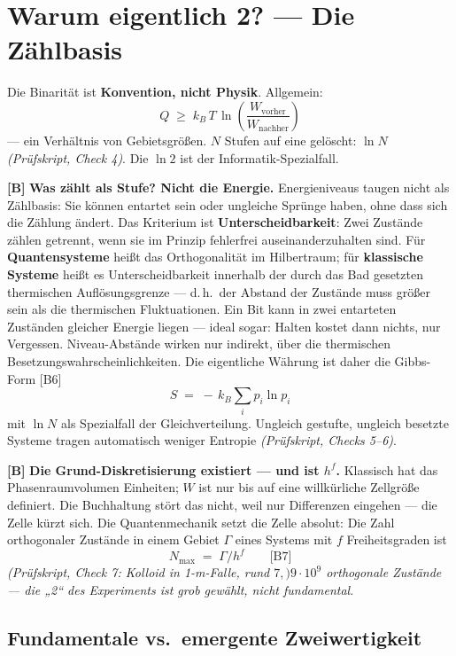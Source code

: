 \section{Warum eigentlich 2? --- Die Zählbasis}
\label{sec:zaehlbasis}

Die Binarität ist \textbf{Konvention, nicht Physik}. Allgemein:
\[
  Q \;\ge\; k_B\,T\,\ln\!\left(\frac{W_{\text{vorher}}}{W_{\text{nachher}}}\right)
\]
--- ein Verhältnis von Gebietsgrößen. $N$ Stufen auf eine gelöscht: $\ln N$
\emph{(Prüfskript, Check 4)}. Die $\ln 2$ ist der Informatik-Spezialfall.

\textbf{[B]} \textbf{Was zählt als Stufe? Nicht die Energie.} Energieniveaus taugen nicht
als Zählbasis: Sie können entartet sein oder ungleiche Sprünge haben, ohne dass
sich die Zählung ändert. Das Kriterium ist \textbf{Unterscheidbarkeit}: Zwei
Zustände zählen getrennt, wenn sie im Prinzip fehlerfrei auseinanderzuhalten sind.
Für \textbf{Quantensysteme} heißt das Orthogonalität im Hilbertraum; für
\textbf{klassische Systeme} heißt es Unterscheidbarkeit innerhalb der durch das
Bad gesetzten thermischen Auflösungsgrenze --- d.\,h.\ der Abstand der Zustände
muss größer sein als die thermischen Fluktuationen. Ein Bit kann in zwei
entarteten Zuständen gleicher Energie liegen --- ideal sogar: Halten kostet dann
nichts, nur Vergessen. Niveau-Abstände wirken nur indirekt, über die thermischen
Besetzungswahrscheinlichkeiten. Die eigentliche Währung ist daher die Gibbs-Form
[B6]
\[
  S \;=\; -\,k_B \sum_i p_i \ln p_i
\]
mit $\ln N$ als Spezialfall der Gleichverteilung. Ungleich gestufte, ungleich
besetzte Systeme tragen automatisch weniger Entropie \emph{(Prüfskript, Checks 5--6)}.

\textbf{[B]} \textbf{Die Grund-Diskretisierung existiert --- und ist $h^f$.} Klassisch hat
das Phasenraumvolumen Einheiten; $W$ ist nur bis auf eine willkürliche Zellgröße
definiert. Die Buchhaltung stört das nicht, weil nur Differenzen eingehen --- die
Zelle kürzt sich. Die Quantenmechanik setzt die Zelle absolut: Die Zahl
orthogonaler Zustände in einem Gebiet $\Gamma$ eines Systems mit $f$
Freiheitsgraden ist
\[
  N_{\max} \;=\; \Gamma / h^f \qquad \text{[B7]}
\]
\emph{(Prüfskript, Check 7: Kolloid in 1-\textmu m-Falle, rund $7{,)}9\cdot10^{9}$ orthogonale
Zustände --- die „2“ des Experiments ist grob gewählt, nicht fundamental}.

\subsection{Fundamentale vs.\ emergente Zweiwertigkeit}

